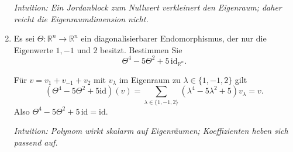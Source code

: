 \documentclass[11pt, a4paper]{article}
\begin{document}
\begin{enumerate}
\begin{framed}
  \medskip\noindent\textit{Intuition: Ein Jordanblock zum Nullwert verkleinert den Eigenraum; daher reicht die Eigenraumdimension nicht.}
  \end{framed}

  \item Es sei $\Theta:\mathbb{R}^n\to\mathbb{R}^n$ ein diagonalisierbarer Endomorphismus, der nur die Eigenwerte $1,-1$ und $2$ besitzt. Bestimmen Sie
  \[
    \Theta^4-5\Theta^2+5\,\mathrm{id}_{\mathbb{R}^n}.
  \]
  \begin{framed}
  Für $v=v_{1}+v_{-1}+v_{2}$ mit $v_\lambda$ im Eigenraum zu $\lambda\in\{1,-1,2\}$ gilt
  \[
  (\Theta^4-5\Theta^2+5\mathrm{id})(v)
  =\sum_{\lambda\in\{1,-1,2\}}(\lambda^4-5\lambda^2+5)v_\lambda
  =v.
  \]
  Also $\Theta^4-5\Theta^2+5\,\mathrm{id}=\mathrm{id}$.

  \medskip\noindent\textit{Intuition: Polynom wirkt skalarm auf Eigenräumen; Koeffizienten heben sich passend auf.}
  \end{framed}
\end{enumerate}
\end{document}
